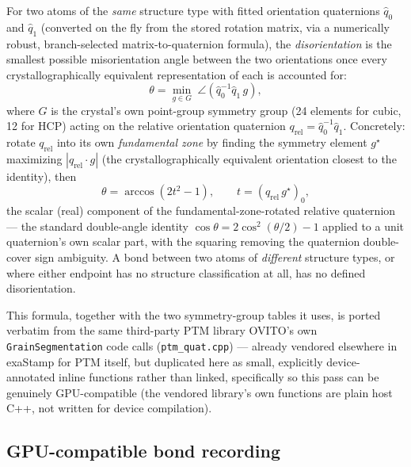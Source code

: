 \documentclass[11pt,a4paper]{article}
\newcommand{\code}[1]{\texttt{#1}}
\newcommand{\quat}[1]{\hat{q}_{#1}}
\begin{document}
For two atoms of the \emph{same} structure type with fitted orientation quaternions $\quat{0}$
and $\quat{1}$ (converted on the fly from the stored rotation matrix, via a numerically robust,
branch-selected matrix-to-quaternion formula), the \emph{disorientation} is the smallest possible
misorientation angle between the two orientations once every crystallographically equivalent
representation of each is accounted for:
\begin{equation}
  \theta = \min_{g \in G} \; \angle\!\left(\quat{0}^{-1}\quat{1}\, g\right),
\end{equation}
where $G$ is the crystal's own point-group symmetry group (24 elements for cubic, 12 for HCP) acting
on the relative orientation quaternion $q_{\text{rel}} = \quat{0}^{-1}\quat{1}$. Concretely: rotate
$q_{\text{rel}}$ into its own \emph{fundamental zone} by finding the symmetry element $g^\star$
maximizing $|q_{\text{rel}}\cdot g|$ (the crystallographically equivalent orientation closest to the
identity), then
\begin{equation}
  \theta = \arccos\!\left(2t^2-1\right), \qquad t = \left(q_{\text{rel}}\, g^\star\right)_0 ,
\end{equation}
the scalar (real) component of the fundamental-zone-rotated relative quaternion — the standard
double-angle identity $\cos\theta = 2\cos^2(\theta/2)-1$ applied to a unit quaternion's own scalar
part, with the squaring removing the quaternion double-cover sign ambiguity. A bond between two
atoms of \emph{different} structure types, or where either endpoint has no structure classification
at all, has no defined disorientation.

This formula, together with the two symmetry-group tables it uses, is ported verbatim from the
same third-party PTM library \cite{ptm2016} OVITO's own \code{GrainSegmentation} code calls
(\code{ptm\_quat.cpp}) — already vendored elsewhere in exaStamp for PTM itself, but duplicated here
as small, explicitly device-annotated inline functions rather than linked, specifically so this
pass can be genuinely GPU-compatible (the vendored library's own functions are plain host C++, not
written for device compilation).

\subsection{GPU-compatible bond recording}
\end{document}
